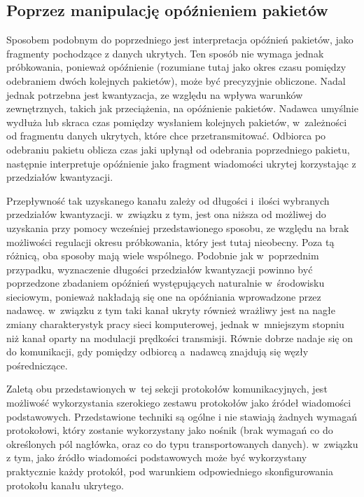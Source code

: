 \documentclass[a4paper, twoside, 12pt]{report}
\begin{document}
        \subsection{Poprzez manipulację opóźnieniem pakietów}
        Sposobem podobnym do poprzedniego jest interpretacja opóźnień pakietów,
        jako fragmenty pochodzące z danych ukrytych.\cite{IPDELAYCHANNEL} Ten sposób nie wymaga jednak próbkowania,
        ponieważ opóźnienie (rozumiane tutaj jako okres czasu pomiędzy odebraniem dwóch
        kolejnych pakietów), może być precyzyjnie obliczone. Nadal jednak potrzebna
        jest kwantyzacja, ze względu na wpływa warunków zewnętrznych, takich jak przeciążenia,
        na opóźnienie pakietów. Nadawca umyślnie wydłuża lub skraca czas pomiędzy
        wysłaniem kolejnych pakietów, w~zależności od fragmentu danych ukrytych,
        które chce przetransmitować. Odbiorca po odebraniu pakietu oblicza czas jaki
        upłynął od odebrania poprzedniego pakietu, następnie
        interpretuje opóźnienie jako fragment wiadomości ukrytej korzystając z
        przedziałów kwantyzacji.

        Przepływność tak uzyskanego kanału zależy od długości i~ilości wybranych
        przedziałów kwantyzacji. w~związku z tym, jest ona niższa od możliwej do
        uzyskania przy pomocy wcześniej przedstawionego sposobu, ze względu na brak
        możliwości regulacji okresu próbkowania, który jest tutaj nieobecny. Poza tą różnicą, oba sposoby mają
        wiele wspólnego. Podobnie jak w~poprzednim przypadku, wyznaczenie długości
        przedziałów kwantyzacji powinno być poprzedzone zbadaniem opóźnień występujących
        naturalnie w~środowisku sieciowym, ponieważ nakładają się one na opóźniania
        wprowadzone przez nadawcę. w~związku z tym taki kanał ukryty również wrażliwy jest
        na nagłe zmiany charakterystyk pracy sieci komputerowej, jednak w~mniejszym
        stopniu niż kanał oparty na modulacji prędkości transmisji. Równie dobrze
        nadaje się on do komunikacji, gdy pomiędzy odbiorcą a~nadawcą znajdują się
        węzły pośredniczące.

        Zaletą obu przedstawionych w~tej sekcji protokołów komunikacyjnych,
        jest możliwość wykorzystania szerokiego zestawu protokołów jako
        źródeł wiadomości podstawowych. Przedstawione techniki są ogólne i
        nie stawiają żadnych wymagań protokołowi, który zostanie wykorzystany jako
        nośnik (brak wymagań co do określonych pól nagłówka, oraz co do typu transportowanych danych).
        w~związku z tym, jako źródło wiadomości podstawowych może być wykorzystany
        praktycznie każdy protokół, pod warunkiem odpowiedniego skonfigurowania
        protokołu kanału ukrytego.
\end{document}
